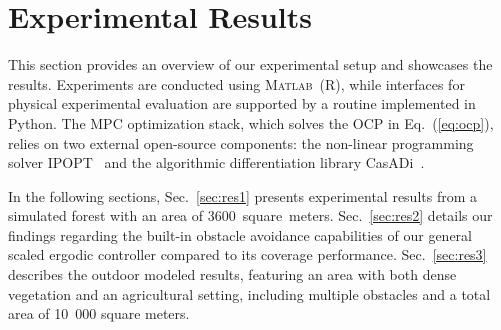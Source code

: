 \documentclass[letterpaper,10pt,conference,twoside]{IEEEtran}
\theoremstyle{definition}
\begin{document}
\section{Experimental Results}\label{sec:res}
\noindent
This section provides an overview of our experimental setup and showcases the results. 
Experiments are conducted using \textsc{Matlab}~(R), while interfaces for physical experimental evaluation are supported by a routine implemented in Python. The MPC optimization stack, which solves the OCP in Eq.~(\ref{eq:ocp}), relies on two external open-source components: the non-linear programming solver IPOPT~\cite{wachter2006implementation} and the algorithmic differentiation library CasADi~\cite{andersson2012casadi}.

In the following sections, Sec.~\ref{sec:res1} presents experimental results from a simulated forest with an area of 3600~square~meters. Sec.~\ref{sec:res2} details our findings regarding the built-in obstacle avoidance capabilities of our general scaled ergodic controller compared to its coverage performance. Sec.~\ref{sec:res3} describes the outdoor modeled results, featuring an area with both dense vegetation and an agricultural setting, including multiple obstacles and a total area of 10~000 square meters.
\end{document}
